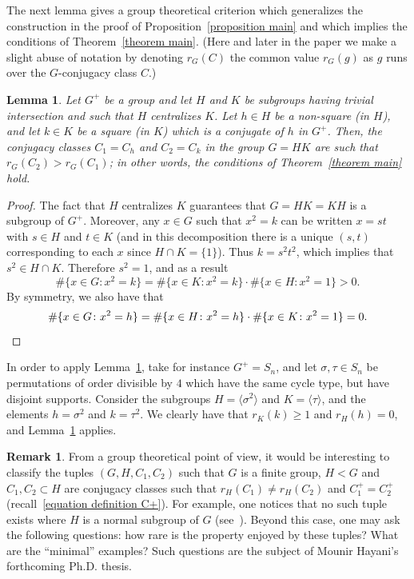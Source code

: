 \documentclass[10pt]{amsart}
\newtheorem{lemma}[X]{Lemma}
\theoremstyle{definition}
\newtheorem*{remark*}{Remark}
\begin{document}
The next lemma gives a
group theoretical criterion which generalizes the construction in the proof of Proposition~\ref{proposition main} and which implies the conditions of Theorem~\ref{theorem main}. (Here and later in the paper we make a slight abuse of notation by denoting $r_G(C)$ the common value $r_G(g)$ as $g$ runs over the $G$-conjugacy class $C$.)

\begin{lemma}
Let $G^+$ be a group and let $H$ and $K$ be subgroups having trivial intersection and such that $H$ centralizes $K$. Let $h\in H$ be a non-square (in $H$), and let $k\in K$ be a square (in $K$) which is a conjugate of $h$ in $G^+$. Then, the conjugacy classes $C_1=C_h$ and $C_2=C_k$ in the group $G=HK$ are such that $r_G(C_2)> r_G(C_1) $; in other words, the conditions of Theorem~\ref{theorem main} hold.

\label{lemma criterion}
\end{lemma}

\begin{proof}
The fact that $H$ centralizes $K$ guarantees that $G=HK=KH$ is a subgroup of $G^+$. Moreover, any $x\in G$ such that $x^2=k$ can be written $x=st$ with $s\in H$ and $t\in K$ (and in this decomposition there is a unique $(s,t)$ corresponding to each $x$ since
$H\cap K=\{1\}$). Thus $k=s^2t^2$, which implies that $s^2\in H\cap K$. Therefore $s^2=1$, and as a result
\[
\#\{x\in G\colon x^2=k\}=\#\{x\in K\colon x^2=k\}\cdot
\#\{x\in H\colon x^2=1\}>0.\]
By symmetry, we also have that
\[\#\{x\in G\colon x^2=h\}=\#\{x\in H\colon x^2=h\}\cdot
\#\{x\in K\colon x^2=1\}=0.\qedhere
\]
\end{proof}

In order to apply Lemma~\ref{lemma criterion},
take for instance $G^+=S_n$, and let $\sigma,\tau \in S_n$ be permutations of order divisible by $4$ which have the same cycle type, but have disjoint supports. Consider the subgroups $H=\langle \sigma^2 \rangle$ and $K=\langle \tau \rangle$, and the elements $h=\sigma^2$ and $k=\tau^2$. We clearly have that $ r_K(k)\geq 1$ and $r_{H}(h)=0 $, and Lemma~\ref{lemma criterion} applies.

\begin{remark*}
From a group theoretical point of view, it would be interesting to classify the tuples $(G,H,C_1,C_2)$ such that $G$ is a finite group, $H <G$ and $C_1, C_2 \subset H$ are conjugacy classes such that $r_H(C_1)\neq r_H(C_2)$ and $C_1^+=C_2^+$ (recall~\eqref{equation definition C+}). For example, one notices that no such tuple exists where $H$ is a normal subgroup of $G$ (see~\cite[Proof of Lem.\,3.13]{FJ}). Beyond this case, one may ask the following questions: how rare is the property enjoyed by these tuples?
What are the ``minimal'' examples?
Such questions are the subject of Mounir Hayani's forthcoming Ph.D. thesis.
\end{remark*}
\end{document}
